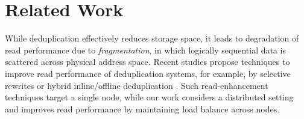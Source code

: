 \section{Related Work}
\label{sec:related}

While deduplication effectively reduces storage space, it leads to degradation
of read performance due to {\em fragmentation}, in which logically sequential
data is scattered across physical address space.  Recent studies propose
techniques to improve read performance of deduplication systems, for example,
by selective rewrites \cite{kaczmarczyk12,lillibridge13,min14} or hybrid
inline/offline deduplication \cite{li15}.  Such read-enhancement techniques
target a single node, while our work considers a distributed setting and
improves read performance by maintaining load balance across nodes. 




